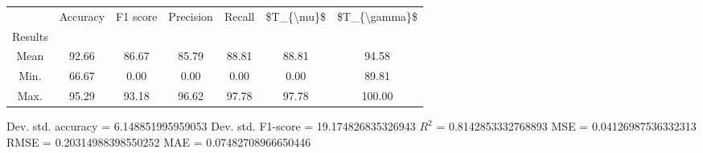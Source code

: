 \begin{tabular}{|c|c|c|c|c|c|c|}
\toprule
{} &  Accuracy &  F1 score &  Precision &  Recall &  \$T\_\{\textbackslash mu\}\$ &  \$T\_\{\textbackslash gamma\}\$ \\
Results &           &           &            &         &            &               \\
\hline
Mean    &     92.66 &     86.67 &      85.79 &   88.81 &      88.81 &         94.58 \\
Min.    &     66.67 &      0.00 &       0.00 &    0.00 &       0.00 &         89.81 \\
Max.    &     95.29 &     93.18 &      96.62 &   97.78 &      97.78 &        100.00 \\
\bottomrule
\end{tabular}

 Dev. std. accuracy = 6.148851995959053
 Dev. std. F1-score = 19.174826835326943
 $R^2$ = 0.8142853332768893
 MSE = 0.04126987536332313
 RMSE = 0.20314988398550252
 MAE = 0.07482708966650446